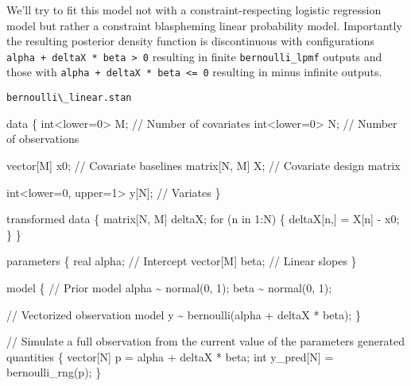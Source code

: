 \documentclass[
  letterpaper,
  DIV=11,
  numbers=noendperiod]{scrartcl}
\newenvironment{Shaded}{\begin{snugshade}}{\end{snugshade}}
\newcommand{\CommentTok}[1]{\textcolor[rgb]{0.37,0.37,0.37}{#1}}
\newcommand{\ControlFlowTok}[1]{\textcolor[rgb]{0.00,0.23,0.31}{#1}}
\newcommand{\DataTypeTok}[1]{\textcolor[rgb]{0.68,0.00,0.00}{#1}}
\newcommand{\DecValTok}[1]{\textcolor[rgb]{0.68,0.00,0.00}{#1}}
\newcommand{\KeywordTok}[1]{\textcolor[rgb]{0.00,0.23,0.31}{#1}}
\newcommand{\NormalTok}[1]{\textcolor[rgb]{0.00,0.23,0.31}{#1}}
\begin{document}
We'll try to fit this model not with a constraint-respecting logistic
regression model but rather a constraint blaspheming linear probability
model. Importantly the resulting posterior density function is
discontinuous with configurations
\texttt{alpha\ +\ deltaX\ *\ beta\ \textgreater{}\ 0} resulting in
finite \texttt{bernoulli\_lpmf} outputs and those with
\texttt{alpha\ +\ deltaX\ *\ beta\ \textless{}=\ 0} resulting in minus
infinite outputs.

\begin{codelisting}

\caption{\texttt{bernoulli\textbackslash\_linear.stan}}

\begin{Shaded}
\begin{Highlighting}[]
\KeywordTok{data}\NormalTok{ \{}
  \DataTypeTok{int}\NormalTok{\textless{}}\KeywordTok{lower}\NormalTok{=}\DecValTok{0}\NormalTok{\textgreater{} M; }\CommentTok{// Number of covariates}
  \DataTypeTok{int}\NormalTok{\textless{}}\KeywordTok{lower}\NormalTok{=}\DecValTok{0}\NormalTok{\textgreater{} N; }\CommentTok{// Number of observations}
  
  \DataTypeTok{vector}\NormalTok{[M] x0;   }\CommentTok{// Covariate baselines}
  \DataTypeTok{matrix}\NormalTok{[N, M] X; }\CommentTok{// Covariate design matrix}
  
  \DataTypeTok{int}\NormalTok{\textless{}}\KeywordTok{lower}\NormalTok{=}\DecValTok{0}\NormalTok{, }\KeywordTok{upper}\NormalTok{=}\DecValTok{1}\NormalTok{\textgreater{} y[N]; }\CommentTok{// Variates}
\NormalTok{\}}

\KeywordTok{transformed data}\NormalTok{ \{}
  \DataTypeTok{matrix}\NormalTok{[N, M] deltaX;}
  \ControlFlowTok{for}\NormalTok{ (n }\ControlFlowTok{in} \DecValTok{1}\NormalTok{:N) \{}
\NormalTok{    deltaX[n,] = X[n] {-} x0\textquotesingle{};}
\NormalTok{  \}}
\NormalTok{\}}

\KeywordTok{parameters}\NormalTok{ \{}
  \DataTypeTok{real}\NormalTok{ alpha;      }\CommentTok{// Intercept}
  \DataTypeTok{vector}\NormalTok{[M] beta;  }\CommentTok{// Linear slopes}
\NormalTok{\}}

\KeywordTok{model}\NormalTok{ \{}
  \CommentTok{// Prior model}
\NormalTok{  alpha \textasciitilde{} normal(}\DecValTok{0}\NormalTok{, }\DecValTok{1}\NormalTok{);}
\NormalTok{  beta \textasciitilde{} normal(}\DecValTok{0}\NormalTok{, }\DecValTok{1}\NormalTok{);}

  \CommentTok{// Vectorized observation model}
\NormalTok{  y \textasciitilde{} bernoulli(alpha + deltaX * beta);}
\NormalTok{\}}

\CommentTok{// Simulate a full observation from the current value of the parameters}
\KeywordTok{generated quantities}\NormalTok{ \{}
  \DataTypeTok{vector}\NormalTok{[N] p = alpha + deltaX * beta;}
  \DataTypeTok{int}\NormalTok{ y\_pred[N] = bernoulli\_rng(p);}
\NormalTok{\}}
\end{Highlighting}
\end{Shaded}

\end{codelisting}
\end{document}
